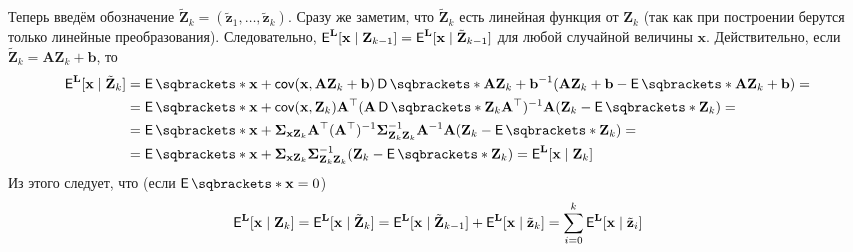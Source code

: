 Теперь введём обозначение \(\tilde{\mathbf{Z}}_{k} = (\tilde{\mathbf{z}}_{1}, 
\ldots, \tilde{\mathbf{z}}_{k})\). Сразу же заметим, что 
\(\tilde{\mathbf{Z}}_{k}\) есть линейная функция от \(\mathbf{Z}_{k}\) (так как 
при построении берутся только линейные преобразования). Следовательно, 
\(\E^{\mathbf{L}}[\mathbf{x} \mid \mathbf{Z}_{k - 1}] = \E^{\mathbf{L}} 
[\mathbf{x} \mid \tilde{\mathbf{Z}}_{k - 1}]\) для любой случайной величины 
\(\mathbf{x}\). Действительно, если \(\tilde{\mathbf{Z}}_{k} = 
\mathbf{A}\mathbf{Z}_{k} + \mathbf{b}\), то 
\begin{align*}
	\E^{\mathbf{L}}[\mathbf{x} \mid \tilde{\mathbf{Z}}_{k}] &= \E{\mathbf{x}} + 
	\cov(\mathbf{x}, \mathbf{A}\mathbf{Z}_{k} + \mathbf{b})\D{\mathbf{A} 
	\mathbf{Z}_{k} + \mathbf{b}}^{-1}(\mathbf{A}\mathbf{Z}_{k} + \mathbf{b} - 
	\E{\mathbf{A}\mathbf{Z}_{k} + \mathbf{b}}) = \\
	&= \E{\mathbf{x}} + \cov(\mathbf{x}, \mathbf{Z}_{k})\mathbf{A}^{\top} 
	(\mathbf{A}\D{\mathbf{Z}_{k}}\mathbf{A}^{\top})^{-1} 
	\mathbf{A}(\mathbf{Z}_{k} - \E{\mathbf{Z}_{k}}) = \\
	&= \E{\mathbf{x}} + \bm{\Sigma}_{\mathbf{xZ}_{k}}\mathbf{A}^{\top} 
	(\mathbf{A}^{\top})^{-1}\bm{\Sigma}_{\mathbf{Z}_{k}\mathbf{Z}_{k}}^{-1} 
	\mathbf{A}^{-1}\mathbf{A}(\mathbf{Z}_{k} - \E{\mathbf{Z}_{k}}) = \\
	&= \E{\mathbf{x}} + \bm{\Sigma}_{\mathbf{xZ}_{k}} 
	\bm{\Sigma}_{\mathbf{Z}_{k}\mathbf{Z}_{k}}^{-1}(\mathbf{Z}_{k} - 
	\E{\mathbf{Z}_{k}}) = \E^{\mathbf{L}}[\mathbf{x} \mid \mathbf{Z}_{k}]
\end{align*}
 Из этого следует, что (если \(\E{\mathbf{x}} = 0\))
\[
	\E^{\mathbf{L}}[\mathbf{x} \mid \mathbf{Z}_{k}] = 
	\E^{\mathbf{L}}[\mathbf{x} \mid \tilde{\mathbf{Z}}_{k}] = 
	\E^{\mathbf{L}}[\mathbf{x} \mid \tilde{\mathbf{Z}}_{k - 1}] +
	\E^{\mathbf{L}}[\mathbf{x} \mid \tilde{\mathbf{z}}_{k}] =
	\sum_{i = 0}^{k} \E^{\mathbf{L}}[\mathbf{x} \mid \tilde{\mathbf{z}}_{i}]
\]

